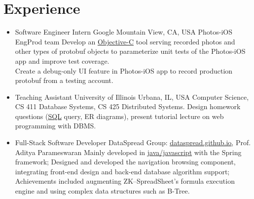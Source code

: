 \documentclass[11pt,a4paper,sans]{moderncv}        %
\begin{document}
\section{Experience}
\begin{itemize}
	
	\item{
	      {Software Engineer Intern}
	      {Google}
	      {Mountain View, CA, USA}
	      {Photos-iOS EngProd team}
	      {Develop an \underline{Objective-C} tool serving recorded photos and other types of protobuf objects to parameterize unit tests of the Photos-iOS app and improve test coverage.\\ Create a debug-only UI feature in Photos-iOS app to record production protobuf from a testing account.}
	      }
	      
	
	\item{
	      {Teaching Assistant}
	      {University of Illinois}
	      {Urbana, IL, USA}
	      {Computer Science, CS 411 Database Systems, CS 425 Distributed Systems.}
	      {Design homework questions (\underline{SQL} query, ER diagrams), present tutorial lecture on web programming with DBMS.}
	      }
	      
	\item{
	      {Full-Stack Software Developer}
	      {\vspace{-10pt}}
	      {}
	      {DataSpread Group:
		      \href{https://dataspread.github.io}{\underline{dataspread.github.io}}, Prof. Aditya Parameswaran}
	      {
		      Mainly developed in \underline{java/javascript} with the Spring framework;
		      Designed and developed the navigation browsing component, integrating front-end design and back-end database algorithm support;
		      Achievements included augmenting ZK--SpreadSheet's formula execution engine and using complex data structures such as B-Tree.}
	      }
	      
	      

\end{itemize}
\end{document}
